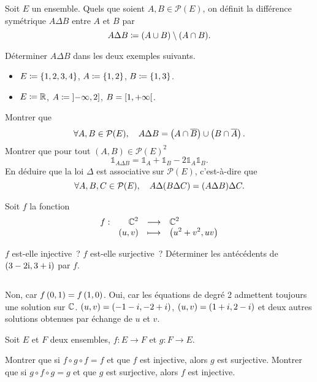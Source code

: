\documentclass{magnolia}
\begin{document}
Soit $E$ un ensemble. Quels que soient $A,B\in\mathcal{P}(E)$, on définit
la différence symétrique $A\Delta B$ entre $A$ et $B$ par
\[A\Delta B\coloneqq(A\cup B)\setminus(A\cap B).\]
\begin{questions}
\question Déterminer $A\Delta B$ dans les deux exemples suivants.
\begin{itemize}
\item $E\coloneqq\left\{1,2,3,4\right\}$, $A\coloneqq\left\{1, 2\right\}$, $B\coloneqq\left\{1, 3\right\}$.
\item $E\coloneqq\mathbb{R}$, $A\coloneqq\left]-\infty,2\right]$, $B=\left[1,+\infty\right[$.
\end{itemize}
\question Montrer que
\[\forall A,B\in\mathcal{P}(E),\quad A\Delta B=\left(A\cap\overline{B}\right)\cup\left(B\cap\overline{A}\right).\]
\question Montrer que pour tout $(A,B)\in\mathcal{P}(E)^2$
\[\mathds{1}_{A\Delta B}=\mathds{1}_A + \mathds{1}_B - 2 \mathds{1}_A \mathds{1}_B.\]
\question En déduire que la loi $\Delta$ est associative sur $\mathcal{P}(E)$,
  c'est-à-dire que
	\[\forall A,B,C\in\mathcal{P}(E),\quad A\Delta(B\Delta C)=(A\Delta B)\Delta C.\]
\end{questions}


Soit $f$ la fonction
\[\begin{array}[t]{lrcl} \displaystyle{f} : & \displaystyle{\mathbb{C}^2} & \longrightarrow & \displaystyle{\mathbb{C}^2} \\ & \displaystyle{\left(u,v\right)} & \longmapsto & \displaystyle{\left(u^2+v^2,uv\right)} \end{array}\]
\begin{questions}
\question $f$ est-elle injective~?
\question $f$ est-elle surjective~?
\question Déterminer les antécédents de $\left(3-2{\rm i},3+{\rm i}\right)$ par $f$.
\end{questions}
\begin{sol}
$\quad$
\begin{questions}
\question Non, car $f\left(0,1\right)=f\left(1,0\right)$.
\question Oui, car les équations de degré 2 admettent toujours une solution
  sur $\mathbb{C}$.
\question $\left(u,v\right)=\left(-1-i,-2+i\right)$, $\left(u,v\right)=\left(1+i,2-i\right)$ et deux autres
  solutions obtenues par échange de $u$ et $v$.
\end{questions}
\end{sol}


Soit $E$ et $F$ deux ensembles, $f:E\to F$ et $g:F\to E$.
\begin{questions}
\question Montrer que si $f\circ g\circ f=f$ et que $f$ est injective, alors $g$ est surjective.
\question Montrer que si $g\circ f\circ g=g$ et que $g$ est surjective, alors $f$ est
injective.
\end{questions}
\end{document}
